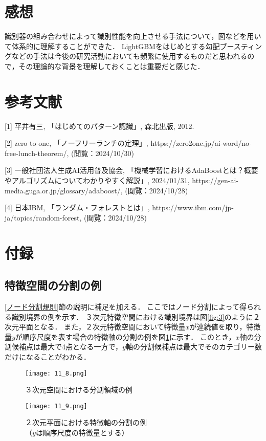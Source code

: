 \documentclass[dvipdfmx]{jreport}
\begin{document}
\section{感想}
識別器の組み合わせによって識別性能を向上させる手法について，図などを用いて体系的に理解することができた．
LightGBMをはじめとする勾配ブースティングなどの手法は今後の研究活動においても頻繁に使用するものだと思われるので，その理論的な背景を理解しておくことは重要だと感じた．

\section{参考文献}

[1] 平井有三, 「はじめてのパターン認識」, 森北出版, 2012.

[2] zero to one, 「ノーフリーランチの定理」, https://zero2one.jp/ai-word/no-free-lunch-theorem/, (閲覧：2024/10/30)

[3] 一般社団法人生成AI活用普及協会, 「機械学習におけるAdaBoostとは？概要やアルゴリズムについてわかりやすく解説」, 2024/01/31, https://gen-ai-media.guga.or.jp/glossary/adaboost/, (閲覧：2024/10/28)

[4] 日本IBM, 「ランダム・フォレストとは」, https://www.ibm.com/jp-ja/topics/random-forest, (閲覧：2024/10/28)

\section{付録}
\subsection{特徴空間の分割の例}
\ref{ノード分割規則}節の説明に補足を加える．
ここではノード分割によって得られる識別境界の例を示す．
３次元特徴空間における識別境界は図\ref{fig:3}のように２次元平面となる．
また，２次元特徴空間において特徴量$x$が連続値を取り，特徴量$y$が順序尺度を表す場合の特徴軸の分割の例を図\ref{fig:4}に示す．
このとき，$x$軸の分割候補点は最大で4点となる一方で，$y$軸の分割候補点は最大でそのカテゴリー数だけになることがわかる．

\begin{figure}[h]
    \centering
    \begin{minipage}[b]{0.49\columnwidth}
        \centering
        \texttt{[image: 11\_8.png]}
        \caption{３次元空間における分割領域の例}\label{fig:3}
    \end{minipage}
    \centering
    \begin{minipage}[b]{0.49\columnwidth}
        \centering
        \texttt{[image: 11\_9.png]}
        \caption{２次元平面における特徴軸の分割の例\\\hspace{25pt}（$y$は順序尺度の特徴量とする）}\label{fig:4}
    \end{minipage}
\end{figure}
\end{document}
